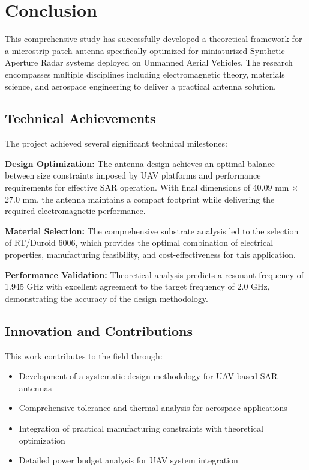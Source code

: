\documentclass[12pt]{article}
\begin{document}
\section{Conclusion}

This comprehensive study has successfully developed a theoretical framework for a microstrip patch antenna specifically optimized for miniaturized Synthetic Aperture Radar systems deployed on Unmanned Aerial Vehicles. The research encompasses multiple disciplines including electromagnetic theory, materials science, and aerospace engineering to deliver a practical antenna solution.

\subsection{Technical Achievements}

The project achieved several significant technical milestones:

\textbf{Design Optimization:} The antenna design achieves an optimal balance between size constraints imposed by UAV platforms and performance requirements for effective SAR operation. With final dimensions of 40.09 mm × 27.0 mm, the antenna maintains a compact footprint while delivering the required electromagnetic performance.

\textbf{Material Selection:} The comprehensive substrate analysis led to the selection of RT/Duroid 6006, which provides the optimal combination of electrical properties, manufacturing feasibility, and cost-effectiveness for this application.

\textbf{Performance Validation:} Theoretical analysis predicts a resonant frequency of 1.945 GHz with excellent agreement to the target frequency of 2.0 GHz, demonstrating the accuracy of the design methodology.

\subsection{Innovation and Contributions}

This work contributes to the field through:
\begin{itemize}
    \item Development of a systematic design methodology for UAV-based SAR antennas
    \item Comprehensive tolerance and thermal analysis for aerospace applications
    \item Integration of practical manufacturing constraints with theoretical optimization
    \item Detailed power budget analysis for UAV system integration
\end{itemize}
\end{document}
